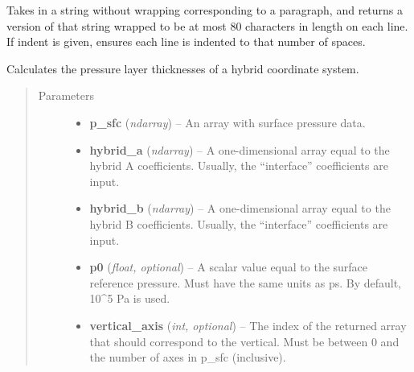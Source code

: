 \documentclass[letterpaper,10pt,english]{sphinxmanual}
\begin{document}

\begin{fulllineitems}
\label{atmos:atmos.util.doc_paragraph}
Takes in a string without wrapping corresponding to a paragraph,
and returns a version of that string wrapped to be at most 80
characters in length on each line.
If indent is given, ensures each line is indented to that number
of spaces.

\end{fulllineitems}


\begin{fulllineitems}
\label{atmos:atmos.util.dpres_hybrid}
Calculates the pressure layer thicknesses of a hybrid coordinate system.
\begin{quote}\begin{description}
\item[{Parameters}] \leavevmode\begin{itemize}
\item {} 
\textbf{p\_sfc} (\emph{ndarray}) -- An array with surface pressure data.

\item {} 
\textbf{hybrid\_a} (\emph{ndarray}) -- A one-dimensional array equal to the hybrid A coefficients. Usually,
the ``interface'' coefficients are input.

\item {} 
\textbf{hybrid\_b} (\emph{ndarray}) -- A one-dimensional array equal to the hybrid B coefficients. Usually,
the ``interface'' coefficients are input.

\item {} 
\textbf{p0} (\emph{float, optional}) -- A scalar value equal to the surface reference pressure. Must have the
same units as ps. By default, 10\textasciicircum{}5 Pa is used.

\item {} 
\textbf{vertical\_axis} (\emph{int, optional}) -- The index of the returned array that should correspond to the vertical.
Must be between 0 and the number of axes in p\_sfc (inclusive).

\end{itemize}


\end{description}
\end{quote}
\end{fulllineitems}
\end{document}

